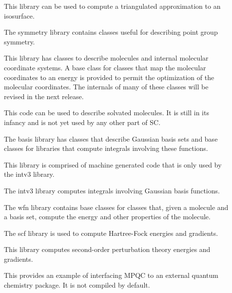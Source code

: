 \documentclass{report}
\begin{document}
\begin{description}
\item[] This library can be used to compute a
  triangulated approximation to an isosurface.

\item[] The symmetry library contains classes
  useful for describing point group symmetry.

\item[] This library has classes to
  describe molecules and internal molecular coordinate systems. A base
  class for classes that map the molecular coordinates to an energy is
  provided to permit the optimization of the molecular coordinates.
  The internals of many of these classes will be revised in the
  next release.

\item[]  This code can be used to
  describe solvated molecules.  It is still in its infancy and
  is not yet used by any other part of SC.

\item[] The basis library has classes
  that describe Gaussian basis sets and base classes for libraries that
  compute integrals involving these functions.

\item[] This library is comprised of
  machine generated code that is only used by the intv3 library.

\item[] The intv3 library computes
  integrals involving Gaussian basis functions.

\item[] The wfn library contains base
  classes for classes that, given a molecule and a basis set, compute the
  energy and other properties of the molecule.

\item[] The scf library is used to compute
  Hartree-Fock energies and gradients.

\item[] This library computes second-order
  perturbation theory energies and gradients.

\item[] This provides an example of
  interfacing MPQC to an external quantum chemistry package.  It
  is not compiled by default.


\end{description}
\end{document}
